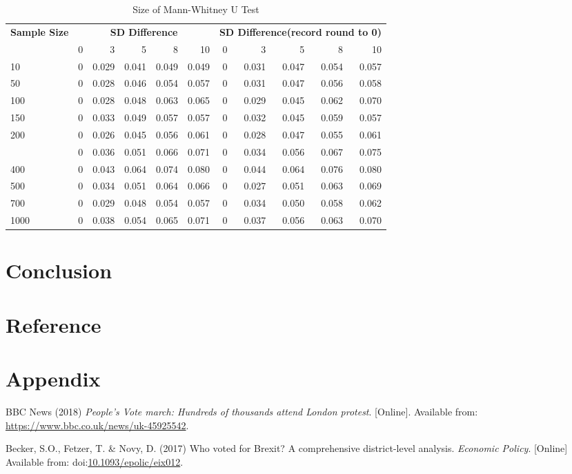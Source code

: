 \documentclass[]{article}
\begin{document}
\begin{table}

\caption{\label{tab:size-tables}Size of Mann-Whitney U Test}
\centering
\begin{tabular}[t]{lrrrrrrrrrr}
\toprule
\multicolumn{1}{c}{\bfseries Sample Size} & \multicolumn{5}{c}{\bfseries SD Difference} & \multicolumn{5}{c}{\bfseries SD Difference(record round to 0)} \\
\cmidrule(l{2pt}r{2pt}){1-1} \cmidrule(l{2pt}r{2pt}){2-6} \cmidrule(l{2pt}r{2pt}){7-11}
  & 0 & 3 & 5 & 8 & 10 & 0 & 3 & 5 & 8 & 10\\
\midrule
10 & 0 & 0.029 & 0.041 & 0.049 & 0.049 & 0 & 0.031 & 0.047 & 0.054 & 0.057\\
50 & 0 & 0.028 & 0.046 & 0.054 & 0.057 & 0 & 0.031 & 0.047 & 0.056 & 0.058\\
100 & 0 & 0.028 & 0.048 & 0.063 & 0.065 & 0 & 0.029 & 0.045 & 0.062 & 0.070\\
150 & 0 & 0.033 & 0.049 & 0.057 & 0.057 & 0 & 0.032 & 0.045 & 0.059 & 0.057\\
200 & 0 & 0.026 & 0.045 & 0.056 & 0.061 & 0 & 0.028 & 0.047 & 0.055 & 0.061\\
\addlinespace
300 & 0 & 0.036 & 0.051 & 0.066 & 0.071 & 0 & 0.034 & 0.056 & 0.067 & 0.075\\
400 & 0 & 0.043 & 0.064 & 0.074 & 0.080 & 0 & 0.044 & 0.064 & 0.076 & 0.080\\
500 & 0 & 0.034 & 0.051 & 0.064 & 0.066 & 0 & 0.027 & 0.051 & 0.063 & 0.069\\
700 & 0 & 0.029 & 0.048 & 0.054 & 0.057 & 0 & 0.034 & 0.050 & 0.058 & 0.062\\
1000 & 0 & 0.038 & 0.054 & 0.065 & 0.071 & 0 & 0.037 & 0.056 & 0.063 & 0.070\\
\bottomrule
\end{tabular}
\end{table}

\hypertarget{conclusion}{%
\section{Conclusion}\label{conclusion}}

\hypertarget{reference}{%
\section{Reference}\label{reference}}

\hypertarget{appendix}{%
\section*{Appendix}\label{appendix}}

\hypertarget{refs}{}
\leavevmode\hypertarget{ref-BBCNews2018}{}%
BBC News (2018) \emph{People's Vote march: Hundreds of thousands attend
London protest}. {[}Online{]}. Available from:
\url{https://www.bbc.co.uk/news/uk-45925542}.

\leavevmode\hypertarget{ref-Becker2017}{}%
Becker, S.O., Fetzer, T. \& Novy, D. (2017) Who voted for Brexit? A
comprehensive district-level analysis. \emph{Economic Policy}.
{[}Online{]} Available from:
doi:\href{https://doi.org/10.1093/epolic/eix012}{10.1093/epolic/eix012}.
\end{document}
